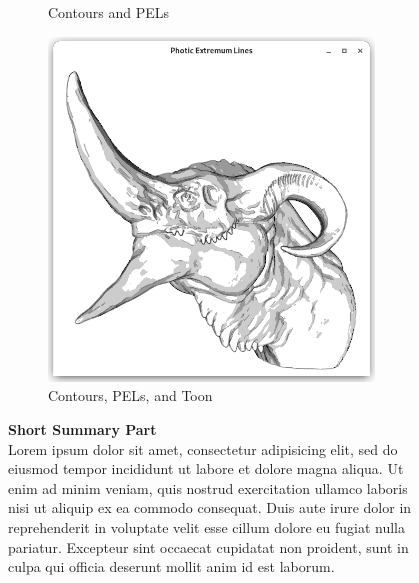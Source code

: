 \documentclass[9pt,fleqn,twoside,twocolumn]{stdglobal}
\begin{document}
\begin{figure}[h]
\begin{subfigure}[b]{0.24\textwidth}
        \caption{Contours and PELs}
      \end{subfigure}%
      \hfill
      \begin{subfigure}[b]{0.24\textwidth}
        \centering
        \includegraphics[width=0.95\textwidth,trim={15px 15 15 50},clip]{images/dragon-head-contour-pel-toon-shader.png}
        \caption{Contours, PELs, and Toon}
      \end{subfigure}%
      \caption{\textbf{Short Summary Part}\\
      Lorem ipsum dolor sit amet, consectetur adipisicing elit, sed do eiusmod
      tempor incididunt ut labore et dolore magna aliqua. Ut enim ad minim veniam,
      quis nostrud exercitation ullamco laboris nisi ut aliquip ex ea commodo
      consequat. Duis aute irure dolor in reprehenderit in voluptate velit esse
      cillum dolore eu fugiat nulla pariatur. Excepteur sint occaecat cupidatat non
      proident, sunt in culpa qui officia deserunt mollit anim id est laborum.}
    \end{figure}
\end{document}
